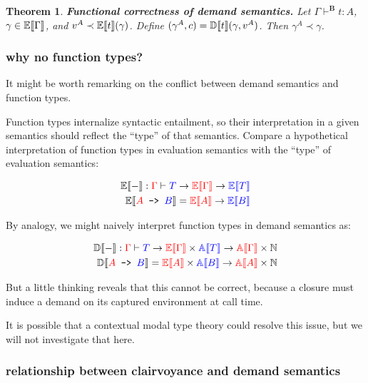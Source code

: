\documentclass[11pt]{article}
\newcommand{\N}{\mathbb{N}}
\DeclarePairedDelimiter{\bbrackets}{\llbracket}{\rrbracket}
\newtheorem{theorem}{Theorem}
\newcommand{\LB}{\mathbf{B}}
\newcommand{\BE}{\mathbb{E}}
\newcommand{\Eval}[1]{\BE\bbrackets{#1}}
\newcommand{\Approx}[1]{\mathbb{A}\bbrackets{#1}}
\newcommand{\BD}{\mathbb{D}}
\newcommand{\Demand}[1]{\BD\bbrackets{#1}}
\begin{document}
\begin{theorem}
\textbf{Functional correctness of demand semantics.}  Let \(\Gamma \vdash^\LB t : A\), \(\gamma \in \Eval{\Gamma}\), and \(v^A \prec \Eval{t}(\gamma)\).  Define \((\gamma^A, c) = \Demand{t}(\gamma, v^A)\).  Then \(\gamma^A \prec \gamma\).
\end{theorem}
\subsubsection{why no function types?}
\label{sec:org6c040ab}

It might be worth remarking on the conflict between demand semantics and function types.

Function types internalize syntactic entailment, so their interpretation in a given semantics should reflect the “type” of that semantics.  Compare a hypothetical interpretation of function types in evaluation semantics with the “type” of evaluation semantics:

\begin{align*}
  \Eval{-} : {\color{red}\Gamma} \vdash {\color{blue}T} \to {\color{red}\Eval{\Gamma}} \to {\color{blue}\Eval{T}} \\
  \Eval{\texttt{$\color{red}A$ -> $\color{blue}B$}} = {\color{red}\Eval{A}} \to {\color{blue}\Eval{B}}
\end{align*}

By analogy, we might naively interpret function types in demand semantics as:

\begin{align*}
  \Demand{-} : {\color{red}\Gamma} \vdash {\color{blue}T} \to {\color{red}\Eval{\Gamma}} \times {\color{blue}\Approx{T}} \to {\color{red}\Approx{\Gamma}} \times \N \\
  \Demand{\texttt{$\color{red}A$ -> $\color{blue}B$}} = {\color{red}\Eval{A}} \times {\color{blue}\Approx{B}} \to {\color{red}\Approx{A}} \times \N
\end{align*}

But a little thinking reveals that this cannot be correct, because a closure must induce a demand on its captured environment at call time.

It is possible that a contextual modal type theory could resolve this issue, but we will not investigate that here.
\subsubsection{relationship between clairvoyance and demand semantics}
\label{sec:org3e0a38d}
\end{document}
